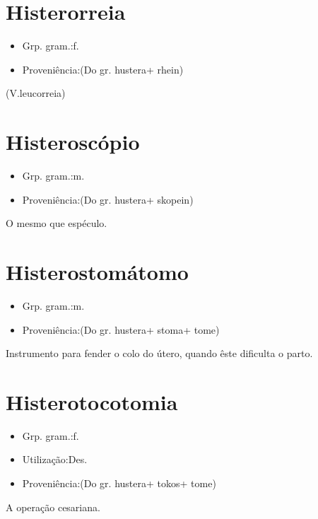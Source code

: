 \documentclass{article}
\begin{document}
\section{Histerorreia}
\begin{itemize}
\item {Grp. gram.:f.}
\end{itemize}
\begin{itemize}
\item {Proveniência:(Do gr. \textunderscore hustera\textunderscore  + \textunderscore rhein\textunderscore )}
\end{itemize}
(V.leucorreia)
\section{Histeroscópio}
\begin{itemize}
\item {Grp. gram.:m.}
\end{itemize}
\begin{itemize}
\item {Proveniência:(Do gr. \textunderscore hustera\textunderscore  + \textunderscore skopein\textunderscore )}
\end{itemize}
O mesmo que \textunderscore espéculo\textunderscore .
\section{Histerostomátomo}
\begin{itemize}
\item {Grp. gram.:m.}
\end{itemize}
\begin{itemize}
\item {Proveniência:(Do gr. \textunderscore hustera\textunderscore  + \textunderscore stoma\textunderscore  + \textunderscore tome\textunderscore )}
\end{itemize}
Instrumento para fender o colo do útero, quando êste dificulta o parto.
\section{Histerotocotomia}
\begin{itemize}
\item {Grp. gram.:f.}
\end{itemize}
\begin{itemize}
\item {Utilização:Des.}
\end{itemize}
\begin{itemize}
\item {Proveniência:(Do gr. \textunderscore hustera\textunderscore  + \textunderscore tokos\textunderscore  + \textunderscore tome\textunderscore )}
\end{itemize}
A operação cesariana.
\end{document}
